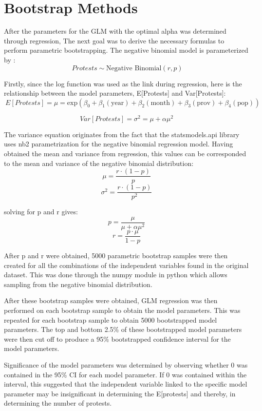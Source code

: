 \documentclass{article}
\begin{document}
\section{Bootstrap Methods}

    After the parameters for the GLM with the optimal alpha was determined through regression, The next goal was to derive the necessary formulas to perform parametric bootstrapping. The negative binomial model is parameterized by :  \[\ Protests \sim \text{Negative Binomial}(r, p) \]

    Firstly, since the log function was used as the link during regression, here is the relationship between the model parameters, E[Protests] and Var[Protests]:
$$
  \ E[Protests] = \mu = \text{exp}\left(\beta_0 + \beta_1 (\mathrm{year}) + \beta_2 (\mathrm{month}) + \beta_3 (\mathrm{prov}) + \beta_4 (\mathrm{pop})\right)
$$

\[Var[Protests] = \sigma^2 = \mu + \alpha \mu^2 \]

    The variance equation originates from the fact that the statsmodels.api library uses nb2 parametrization for the negative binomial regression model. Having obtained the mean and variance from regression, this values can be corresponded to the mean and variance of the negative binomial distribution:
\[\mu = \frac{r \cdot (1-p)}{p}\]
\[\sigma^2 = \frac{r \cdot (1-p)}{p^2}\]

solving for p and r gives: 
\[p = \frac{\mu}{\mu + \alpha \mu^2}\]
\[r = \frac{p \cdot \mu }{1 - p}\]

    After p and r were obtained, 5000 parametric bootstrap samples were then created for all the combinations of the independent variables found in the original dataset. This was done through the numpy module in python which allows sampling from the negative binomial distribution. 

After these bootstrap samples were obtained, GLM regression was then performed on each bootstrap sample to obtain the model parameters. This was repeated for each bootstrap sample to obtain 5000 bootstrapped model parameters. The top and bottom 2.5\% of these bootstrapped model parameters were then cut off to produce a 95\% bootstrapped confidence interval for the model parameters.

    Significance of the model parameters was determined by observing whether 0 was contained in the 95\% CI for each model parameter. If 0 was contained within the interval, this suggested that the independent variable linked to the specific model parameter may be insignificant in determining the E[protests] and thereby, in determining the number of protests. 
\end{document}
